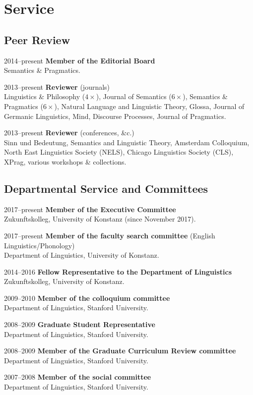 \section*{Service}
%
\subsection*{Peer Review}
%   
\begin{dated}
	\item[2014--present]
		\textbf{Member of the Editorial Board}\\
		Semantics \& Pragmatics.
	\item[2013--present]
		\textbf{Reviewer} (journals)\\
		Linguistics \& Philosophy ($4\times$),
		Journal of Semantics ($6\times$),
		Semantics \& Pragmatics ($6\times$),
		Natural Language and Linguistic Theory,
		Glossa,
		Journal of Germanic Linguistics,
		Mind,
		Discourse Processes,
		Journal of Pragmatics.
	\item[2013--present]
		 \textbf{Reviewer} (conferences, \&c.)\\
		Sinn und Bedeutung,
		Semantics and Linguistic Theory, 
		Amsterdam Colloquium, 
		North East Linguistics Society (NELS), 
		Chicago Linguistics Society (CLS), 
		XPrag, 
		various workshops \& collections.
\end{dated}
%
\subsection*{Departmental Service and Committees}
%
\begin{dated}
	\item[2017--present]
		\textbf{Member of the Executive Committee}\\
		Zukunftskolleg, University of Konstanz (since November 2017).
	\item[2017--present]
		\textbf{Member of the faculty search committee} (English Linguistics/Phonology)\\
		Department of Linguistics, University of Konstanz.
	\item[2014--2016]
		\textbf{Fellow Representative to the Department of Linguistics}\\
	    Zukunftskolleg, University of Konstanz.
	\item[2009--2010]
		\textbf{Member of the colloquium committee}\\
		Department of Linguistics, Stanford University.
	\item[2008--2009]
		\textbf{Graduate Student Representative}\\
		Department of Linguistics, Stanford University.
	\item[2008--2009]
		\textbf{Member of the Graduate Curriculum Review committee}\\
		Department of Linguistics, Stanford University.
	\item[2007--2008]
		\textbf{Member of the social committee}\\
	    Department of Linguistics, Stanford University.
\end{dated}
%
